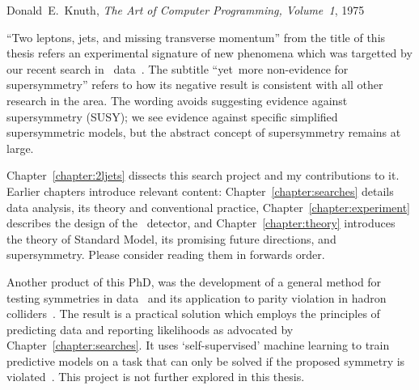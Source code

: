 \begin{preface}
\begin{singlespacing}
\begin{epigraphs}
%
{Donald~E.~Knuth,
\textit{The Art of Computer Programming, Volume~1},
1975~\cite{knuth1975art}}
\end{epigraphs}
\end{singlespacing}
\noindent
``Two leptons, jets, and missing transverse momentum'' from the title of this
thesis refers an experimental signature of new phenomena which was targetted by
our recent search in \atlas\ data~\cite{atlas2022searches}.
The subtitle ``yet~more non-evidence for supersymmetry'' refers to how its
negative result is consistent with all other research in the area.
The wording avoids suggesting evidence against supersymmetry (SUSY);
we see evidence against specific simplified supersymmetric models, but the
abstract concept of supersymmetry remains at large.

Chapter~\ref{chapter:2ljets} dissects this search project and my contributions
to it.
Earlier chapters introduce relevant content:
Chapter~\ref{chapter:searches} details data analysis,
its theory and conventional practice,
Chapter~\ref{chapter:experiment} describes the design of the \atlas\ detector,
and
Chapter~\ref{chapter:theory} introduces the theory of Standard Model, its
promising future directions, and supersymmetry.
Please consider reading them in forwards order.

Another product of this PhD,
was the development of a general method for testing symmetries in data~\cite{
lester2021stressed,
tombs2021which
}
and its application to parity violation in hadron colliders~\cite{
lester2022hunting,
Lester:2019bso,
lesterChiralMeasurements2021,
Gripaios:2020hya,
lester2021lorentz
}.
The result is a practical solution which employs the principles of predicting
data and reporting likelihoods as advocated by Chapter~\ref{chapter:searches}.
It uses `self-supervised' machine learning to train predictive models on a
task that can only be solved if the proposed symmetry is violated~\cite{
tombs2021which,
pmlr-v139-radford21a,
Noroozi2016jigsaw,
multitaskself2017,
devlin2019bert
}.
This project is not further explored in this thesis.
\end{preface}

\tableofcontents

\thispagestyle{empty}

